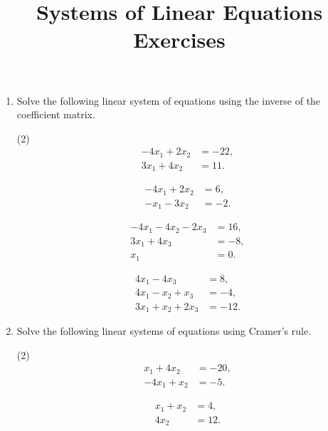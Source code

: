 \documentclass[a4paper,11pt]{article}
\title{Systems of Linear Equations Exercises}
\begin{document}
\maketitle

\begin{enumerate}[label=2.\arabic*]
    \item Solve the following linear system of equations using the inverse of the coefficient matrix.
    \begin{tasks}(2)
        \task
        \begin{align*}
             - 4 x_{1} + 2 x_{2} &= -22, \\
             3 x_{1} + 4 x_{2} &= 11.
        \end{align*}

        \task
        \begin{align*}
             - 4 x_{1} + 2 x_{2} &= 6, \\
             - x_{1} - 3 x_{2} &= -2.
        \end{align*}

        \task
        \begin{align*}
             - 4 x_{1} - 4 x_{2} - 2 x_{3} &= 16, \\
             3 x_{1} + 4 x_{3} &= -8, \\
             x_{1} &= 0.
        \end{align*}

        \task
        \begin{align*}
             4 x_{1} - 4 x_{3} &= 8, \\
             4 x_{1} -  x_{2} +  x_{3} &= -4, \\
             3 x_{1} +  x_{2} + 2 x_{3} &= -12.
        \end{align*}
    \end{tasks}

    \item Solve the following linear systems of equations using Cramer's rule.
    \begin{tasks}(2)
        \task
        \begin{align*}
            x_{1} + 4 x_{2} &= -20, \\
            - 4 x_{1} +  x_{2} &= -5.
       \end{align*} 
       
       \task
       \begin{align*}
            x_{1} +  x_{2} &= 4, \\
            4 x_{2} &= 12.
        \end{align*}


\end{tasks}
\end{enumerate}
\end{document}
